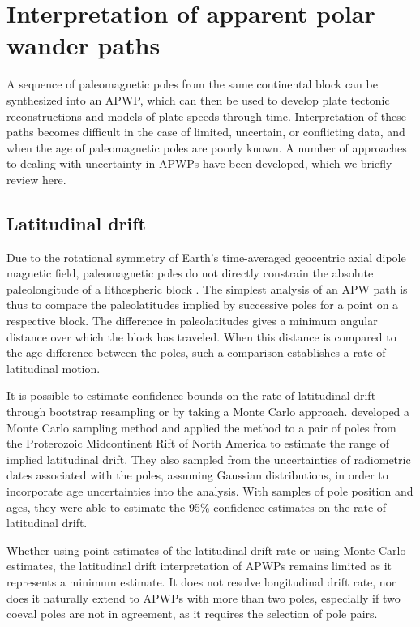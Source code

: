 \documentclass[11pt,letterpaper]{article}
\begin{document}
\section*{Interpretation of apparent polar wander paths}

A sequence of paleomagnetic poles from the same continental block can be synthesized into an APWP, which can then be used to develop plate tectonic reconstructions and models of plate speeds through time. Interpretation of these paths becomes difficult in the case of limited, uncertain, or conflicting data, and when the age of paleomagnetic poles are poorly known. A number of approaches to dealing with uncertainty in APWPs have been developed, which we briefly review here.

\subsection*{Latitudinal drift}
Due to the rotational symmetry of Earth's time-averaged geocentric axial dipole magnetic field, paleomagnetic poles do not directly constrain the absolute paleolongitude of a lithospheric block \citep{Butler1992a}. The simplest analysis of an APW path is thus to compare the paleolatitudes implied by successive poles for a point on a respective block. The difference in paleolatitudes gives a minimum angular distance over which the block has traveled.  When this distance is compared to the age difference between the poles, such a comparison establishes a rate of latitudinal motion.

It is possible to estimate confidence bounds on the rate of latitudinal drift through bootstrap resampling \citep[e.g.][]{Tarduno1990b} or by taking a Monte Carlo approach. \citet{Swanson-Hysell2014b} developed a Monte Carlo sampling method and applied the method to a pair of poles from the Proterozoic Midcontinent Rift of North America to estimate the range of implied latitudinal drift. They also sampled from the uncertainties of radiometric dates associated with the poles, assuming Gaussian distributions, in order to incorporate age uncertainties into the analysis. With samples of pole position and ages, they were able to estimate the 95\% confidence estimates on the rate of latitudinal drift.

Whether using point estimates of the latitudinal drift rate or using Monte Carlo estimates, the latitudinal drift interpretation of APWPs remains limited as it represents a minimum estimate. It does not resolve longitudinal drift rate, nor does it naturally extend to APWPs with more than two poles, especially if two coeval poles are not in agreement, as it requires the selection of pole pairs.
\end{document}
